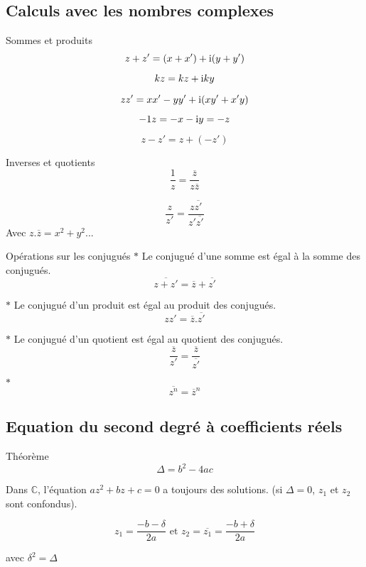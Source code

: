 \subsection{Calculs avec les nombres complexes}

\begin{bclogo}{Sommes et produits}
\[z+z'=(x+x')+\mathrm{i} (y+y')\]

\[kz=kz+\mathrm{i} ky\]

\[zz'=xx'-yy'+\mathrm{i} (xy'+x'y)\]

\[-1z=-x-\mathrm{i} y=-z\]

\[z-z'=z+(-z')\]
\end{bclogo}

\medskip

\begin{bclogo}{Inverses et quotients}
\[\frac{1}{z}=\frac{\overline{z}}{z\overline{z}}\]

\[\frac{z}{z'}=\frac{z\overline{z'}}{z'\overline{z'}}\]
Avec $z.\overline{z}=x^2+y^2$...
\end{bclogo}

\medskip

\begin{bclogo}{Opérations sur les conjugués}
$\ast$ Le conjugué d'une somme est égal à la somme des conjugués. \[\overline{z+z'}=\overline{z}+\overline{z'}\]

$\ast$ Le conjugué d'un produit est égal au produit des conjugués. \[zz'=\overline{z}.\overline{z'}\]

$\ast$ Le conjugué d'un quotient est égal au quotient des conjugués. \[\overline{\frac{z}{z'}}=\frac{\overline{z}}{\overline{z'}}\]

$\ast$ \[\overline{z^n}=\overline{z}^n\]
\end{bclogo}

\subsection{Equation du second degré à coefficients réels}

\begin{bclogo}{Théorème}
\[\Delta=b^2-4ac\]

Dans $\mathbb{C}$, l'équation $az^2+bz+c=0$ a toujours des solutions. (si $\Delta=0$, $z_1$ et $z_2$ sont confondus).

\[z_1=\frac{-b-\delta}{2a} \text{ et }  z_2=\overline{z_1}=\frac{-b+\delta}{2a}\]

avec $\delta ^2=\Delta$
\end{bclogo}

